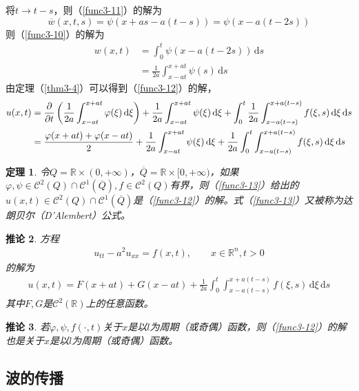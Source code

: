 \documentclass[11pt, a4paper]{article}
\theoremstyle{theorem}
\newtheorem{thm}{定理}[section]
\newtheorem{cor}[thm]{推论}
\newcommand{\intd}[1]{\,\mathrm{d}{#1}}
\begin{document}
将$t \rightarrow t - s$，则（\ref{func3-11}）的解为
$$
\overline{w}(x,t,s) = \psi(x+as - a(t-s)) = \psi(x - a(t - 2s))
$$
则（\ref{func3-10}）的解为
\begin{align*}
w(x,t) &= \int_0^t \psi(x-a(t-2s)) \intd s \\
&= \frac{1}{2a} \int_{x-at}^{x+at} \psi(s) \intd s
\end{align*}
由定理（\ref{thm3-4}）可以得到（\ref{func3-12}）的解，
\begin{align}
    u(x,t) &= \frac{\partial}{\partial t} \left(\frac{1}{2a} \int_{x-at}^{x+at} \varphi(\xi) \intd \xi \right) + \frac{1}{2a} \int_{x-at}^{x+at} \psi(\xi) \intd \xi + \int_0^t \frac{1}{2a} \int_{x-a(t-s)}^{x+a(t-s)} f(\xi, s) \intd \xi \intd s \notag \\
    \label{func3-13}
    &= \frac{\varphi(x + at) + \varphi(x - at)}{2} + \frac{1}{2a} \int_{x-at}^{x+at} \psi(\xi) \intd \xi+ \frac{1}{2a} \int_0^t \int_{x-a(t-s)}^{x+a(t-s)} f(\xi, s) \intd \xi \intd s
\end{align}

\begin{thm}
令$Q = \mathbb{R} \times (0, +\infty)$，$\overline{Q} = \mathbb{R} \times [0, + \infty)$，如果$\varphi, \psi \in \mathcal{C}^2(Q) \cap \mathcal{C}^1(\overline{Q}), f \in \mathcal{C}^2(Q)$有界，则（\ref{func3-13}）给出的$u(x,t) \in \mathcal{C}^2(Q) \cap \mathcal{C}^1(\overline{Q})$是（\ref{func3-12}）的解。式（\ref{func3-13}）又被称为\emph{达朗贝尔（D'Alembert）公式}。
\end{thm}

\begin{cor}
方程
\begin{align}
    u_{tt} - a^2 u_{xx} = f(x,t), \quad \quad x \in \mathbb{R}^n, t > 0
\end{align}
的解为
\begin{align}
    u(x,t) = F(x + at) + G(x-at) + \frac{1}{2a} \int_0^t \int_{x - a(t-s)}^{x + a(t-s)} f(\xi, s) \intd \xi \intd s
\end{align}
其中$F, G$是$\mathcal{C}^2(\mathbb{R})$上的任意函数。
\end{cor}

\begin{cor}
若$\varphi, \psi, f(\cdot, t)$关于$x$是以$l$为周期（或奇偶）函数，则（\ref{func3-12}）的解也是关于$x$是以$l$为周期（或奇偶）函数。
\end{cor}

\subsection{波的传播}
\end{document}
